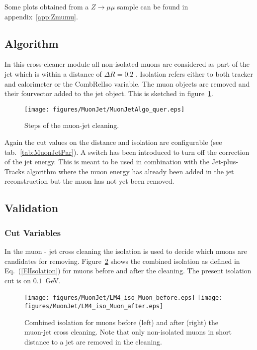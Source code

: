 \documentclass{cmspaper}
\begin{document}
Some plots obtained from a $Z\rightarrow\mu\mu$ sample can be found in appendix~\ref{app:Zmumu}.


\subsection{Algorithm}
In this cross-cleaner module all non-isolated muons are considered as part of
the jet which is within a distance of $\Delta R=0.2$ . Isolation refers either
to both tracker and calorimeter or the CombRelIso variable. The muon objects
are removed and their fourvector added to the jet object. 
This is sketched in figure~\ref{fig:MJCleaning}.

\begin{figure}[hbt]
\begin{center}
\texttt{[image: figures/MuonJet/MuonJetAlgo\_quer.eps]}
\caption{Steps of the muon-jet cleaning.}
\label{fig:MJCleaning}
\end{center}
\end{figure}

Again the cut values on the distance and isolation are configurable (see
tab.~\ref{tab:MuonJetPar}). A switch has been introduced to turn off the
correction of the jet energy. This is meant to be used in combination with the
Jet-plus-Tracks algorithm where the muon energy has already been added in the
jet reconstruction but the muon has not yet been removed.

\subsection{Validation}
\subsubsection{Cut Variables}
In the muon - jet cross cleaning the isolation is used to decide which muons
are candidates for removing. Figure~\ref{fig:MuonIsolation} shows
the
combined isolation as defined in Eq.~(\ref{ElIsolation}) for muons before and
after the cleaning. The present isolation cut is on $0.1$\ GeV. 

\begin{figure}[hb]
\begin{center}
    \texttt{[image: figures/MuonJet/LM4\_iso\_Muon\_before.eps]}
    \texttt{[image: figures/MuonJet/LM4\_iso\_Muon\_after.eps]}
    \caption{Combined isolation for muons before (left) and after (right) the
    muon-jet cross cleaning. Note that only non-isolated muons in short
    distance to a jet are removed in the cleaning.}
\label{fig:MuonIsolation}
\end{center}
\end{figure}
\end{document}

